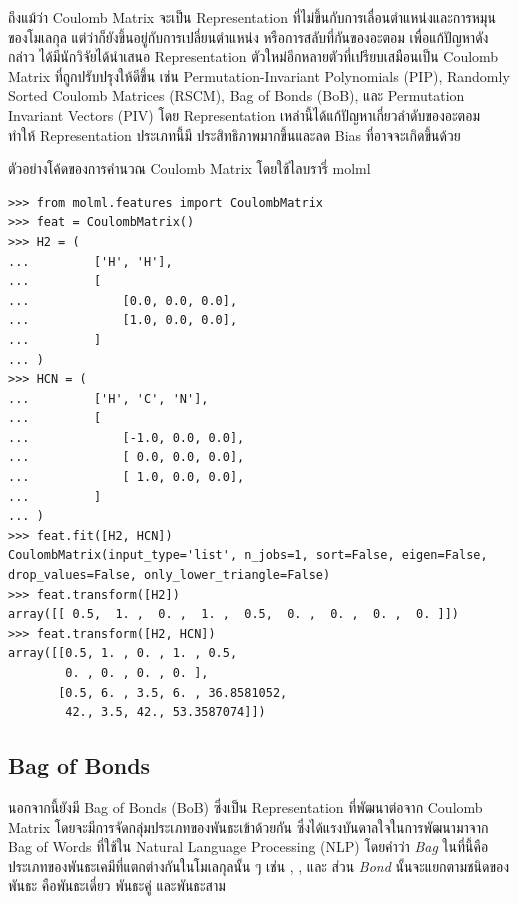 ถึงแม้ว่า Coulomb Matrix จะเป็น Representation ที่ไม่ขึ้นกับการเลื่อนตำแหน่งและการหมุนของโมเลกุล แต่ว่าก็ยังขึ้นอยู่กับการเปลี่ยนตำแหน่ง%
หรือการสลับที่กันของอะตอม เพื่อแก้ปัญหาดังกล่าว ได้มีนักวิจัยได้นำเสนอ Representation ตัวใหม่อีกหลายตัวที่เปรียบเสมือนเป็น Coulomb Matrix 
ที่ถูกปรับปรุงให้ดีขึ้น เช่น Permutation-Invariant Polynomials (PIP)\autocite{braams2009}, Randomly Sorted Coulomb Matrices 
(RSCM)\autocite{hansen2013}, Bag of Bonds (BoB)\autocite{hansen2013}, และ Permutation Invariant Vectors 
(PIV)\autocite{gallet2013} โดย Representation เหล่านี้ได้แก้ปัญหาเกี่ยวลำดับของอะตอม ทำให้ Representation ประเภทนี้มี%
ประสิทธิภาพมากขึ้นและลด Bias ที่อาจจะเกิดขึ้นด้วย

ตัวอย่างโค้ดของการคำนวณ Coulomb Matrix โดยใช้ไลบรารี่ molml\autocite{collins2018}

\begin{lstlisting}[style=MyPython]
>>> from molml.features import CoulombMatrix
>>> feat = CoulombMatrix()
>>> H2 = (
...         ['H', 'H'],
...         [
...             [0.0, 0.0, 0.0],
...             [1.0, 0.0, 0.0],
...         ]
... )
>>> HCN = (
...         ['H', 'C', 'N'],
...         [
...             [-1.0, 0.0, 0.0],
...             [ 0.0, 0.0, 0.0],
...             [ 1.0, 0.0, 0.0],
...         ]
... )
>>> feat.fit([H2, HCN])
CoulombMatrix(input_type='list', n_jobs=1, sort=False, eigen=False, drop_values=False, only_lower_triangle=False)
>>> feat.transform([H2])
array([[ 0.5,  1. ,  0. ,  1. ,  0.5,  0. ,  0. ,  0. ,  0. ]])
>>> feat.transform([H2, HCN])
array([[0.5, 1. , 0. , 1. , 0.5,
        0. , 0. , 0. , 0. ],
       [0.5, 6. , 3.5, 6. , 36.8581052,
        42., 3.5, 42., 53.3587074]])
\end{lstlisting}

\subsection{Bag of Bonds}
\label{ssec:bob}

นอกจากนี้ยังมี Bag of Bonds (BoB)\autocite{hansen2015} ซึ่งเป็น Representation ที่พัฒนาต่อจาก Coulomb Matrix 
โดยจะมีการจัดกลุ่มประเภทของพันธะเข้าด้วยกัน ซึ่งได้แรงบันดาลใจในการพัฒนามาจาก Bag of Words ที่ใช้ใน Natural Language Processing
(NLP) โดยคำว่า \textit{Bag} ในที่นี้คือประเภทของพันธะเคมีที่แตกต่างกันในโมเลกุลนั้น ๆ เช่น , , และ  
ส่วน \textit{Bond} นั้นจะแยกตามชนิดของพันธะ คือพันธะเดี่ยว พันธะคู่ และพันธะสาม

